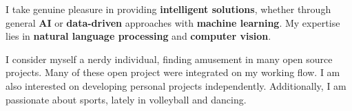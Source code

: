 

\begin{cvparagraph}


\begin{justify}


I take genuine pleasure in providing {\bf intelligent solutions}, whether through
general {\bf AI} or {\bf data-driven} approaches with {\bf machine learning}. My expertise lies
in {\bf natural language processing} and {\bf computer vision}.

\noindent I consider myself a nerdy individual, finding amusement in many open
source projects. Many of these open project were integrated on my working flow.
I am also interested on developing personal projects independently.
Additionally, I am passionate about sports, lately in volleyball and
dancing.


\end{justify}


\end{cvparagraph}
